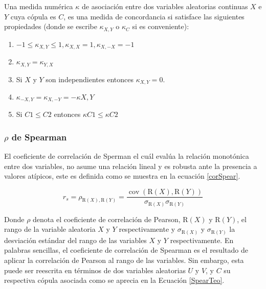 \begin{defn}
    Una medida numérica $\kappa$ de asociación entre dos variables aleatorias continuas $X$ e $Y$ cuya cópula es $C$, es una medida de concordancia si satisface las siguientes propiedades (donde se escribe $\kappa_{X,Y}$ o $\kappa_{C}$ si es conveniente):

    \begin{enumerate}
        \item $-1 \leq \kappa_{X,Y} \leq 1, \kappa_{X,X} = 1, \kappa_{X,-X} = -1$

        \item $\kappa_{X,Y} = \kappa_{Y,X}$

        \item Si $X$ y $Y$ son independientes entonces $\kappa_{X,Y} = 0$.

        \item $\kappa_{-X,Y} = \kappa_{X,-Y} = -\kappa X,Y$
        \item Si $C1 \leq C2$ entonces $\kappa C1 \leq \kappa C2$
    \end{enumerate}
\end{defn}
\subsubsection{$\rho$ de Spearman}

El coeficiente de correlación de Sperman el cuál evalúa la relación monotónica entre dos variables, no asume una relación lineal y es robusta ante la presencia a valores atípicos, este es definida como se muestra en la ecuación \eqref{corSpear}.  

\begin{equation}\label{corSpear}
    r_s=\rho_{\mathrm{R}(X), \mathrm{R}(Y)}=\frac{\operatorname{cov}(\mathrm{R}(X), \mathrm{R}(Y))}{\sigma_{\mathrm{R}(X)} \sigma_{\mathrm{R}(Y)}}
\end{equation}

Donde $\rho$ denota el coeficiente de correlación de Pearson, $\mathrm{R}(X)$ y $\mathrm{R}(Y)$, el rango de la variable aleatoria $X$ y $Y$ respectivamente y $\sigma_{\mathrm{R}(X)}$ y $\sigma_{\mathrm{R}(Y)}$ la desviación estándar del rango de las variables $X$ y $Y$ respectivamente. En palabras sencillas, el coeficiente de correlación de Spearman es el resultado de aplicar la correlación de Pearson al rango de las variables. Sin embargo, esta puede ser reescrita en términos de dos variables aleatorias $U$ y $V$, y $C$ su respectiva cópula asociada como se aprecia en la Ecuación \eqref{SpearTeo}.


